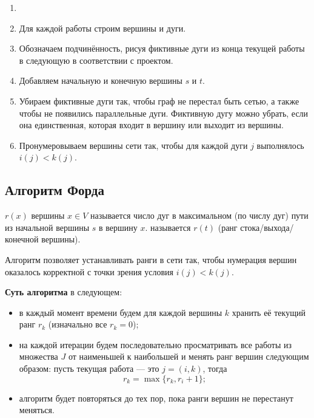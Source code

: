 
\begin{enumerate}[nosep]
	\item[]
	
	\item Для каждой работы строим вершины и дуги.
	
	\item Обозначаем подчинённость, рисуя фиктивные дуги из конца текущей работы в следующую в соответствии с проектом.
	
	\item Добавляем начальную и конечную вершины $s$ и $t$.
	
	\item Убираем фиктивные дуги так, чтобы граф не перестал быть сетью, а также чтобы не появились параллельные дуги. Фиктивную дугу можно убрать, если она единственная, которая входит в вершину или выходит из вершины.
	
	\item Пронумеровываем вершины сети так, чтобы для каждой дуги $j$ выполнялось $i(j) < k(j)$.
\end{enumerate}

\subsection{Алгоритм Форда}


 $r(x)$ вершины $x \in V$ называется число дуг в максимальном (по числу дуг) пути из начальной вершины $s$ в вершину $x$.  называется $r(t)$ (ранг стока/выхода/конечной вершины).

\algorithm[Форда]\label{alg:ford}

Алгоритм позволяет устанавливать ранги в сети так, чтобы нумерация вершин оказалось корректной с точки зрения условия $i(j) < k(j)$.

\textbf{Суть алгоритма} в следующем:

\begin{itemize}[nosep]
	\item в каждый момент времени будем для каждой вершины $k$ хранить её текущий ранг $r_k$ (изначально все $r_k = 0$);
	
	\item на каждой итерации будем последовательно просматривать все работы из множества $J$ от наименьшей к наибольшей и менять ранг вершин следующим образом: пусть текущая работа --- это $j = (i, k)$, тогда
	\[
	r_k = \max\{r_k, r_i+1\};
	\]
	
	\item алгоритм будет повторяться до тех пор, пока ранги вершин не перестанут меняться.
\end{itemize}

